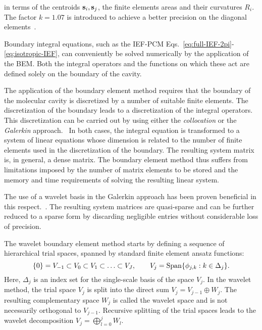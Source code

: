 in terms of the centroids $\mathbf{s}_i, \mathbf{s}_j$, the finite elements
areas and their curvatures $R_i$. The factor $k=1.07$ is introduced to achieve a better precision on the diagonal elements~\cite{Tomasi2005}.


Boundary integral equations, such as the \acs{IEF}-\acs{PCM}
Eqs.~\eqref{eq:full-IEF-2pi}-\eqref{eq:isotropic-IEF},
can conveniently be solved numerically by the application of the
\ac{BEM}.
Both the integral operators and the functions on which these act are
defined solely on the boundary of the cavity.

The application of the boundary element method requires that the boundary of
the molecular cavity is discretized by a number of suitable finite elements.
The discretization of the boundary leads to a discretization of the integral
operators. This discretization can be carried out by using either the
\emph{collocation} or the \emph{Galerkin}
approach.~\autocite{Hackbusch1995-uq, Ern2004-oo}
In both cases, the integral equation is transformed to a system of
linear equations whose dimension is related to the number of finite
elements used in the discretization of the boundary.
The resulting system matrix is, in general, a dense matrix. The
boundary element method thus suffers from limitations imposed by the
number of matrix elements to be stored and the memory and time
requirements of solving the resulting linear system.

The use of a wavelet basis in the Galerkin approach has been proven
beneficial in this respect.~\autocite{Harbrecht2004-uo, Dahmen2006-pj,
Harbrecht2006-ug}.
The resulting system matrices are quasi-sparse
and can be further reduced to a sparse form by discarding
negligible entries without considerable loss of precision.

The wavelet boundary element method starts by defining
a sequence of hierarchical trial spaces,
spanned by standard finite element ansatz functions:
\begin{equation}
  \{0\} = V_{-1} \subset V_0 \subset V_1 \subset \ldots
  \subset V_J, \qquad V_j = \mathop{}\!\mathrm{Span}\{\phi_{j,k} : k\in \Delta_{j}\}.
\end{equation}
Here, $\Delta_j$ is an index set for the
single-scale basis of the space $V_j$. In the wavelet method,
the trial space $V_j$ is split into the direct sum $V_j = V_{j-1}
\oplus W_j$. The resulting complementary space $W_j$ is called the
wavelet space and is not necessarily orthogonal to $V_{j-1}$.
Recursive splitting of the trial spaces leads to the wavelet
decomposition $V_j = \bigoplus_{l = 0}^{j} W_l$.

